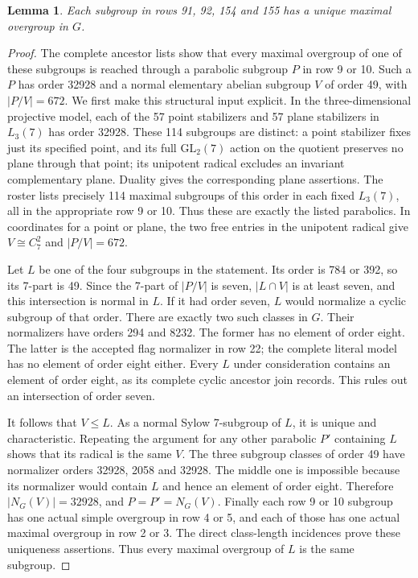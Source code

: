 \documentclass[11pt,a4paper]{article}
\newtheorem{lemma}{Lemma}\newtheorem{theorem}{Theorem}
\begin{document}
\begin{lemma}\label{alignment}
Each subgroup in rows 91, 92, 154 and 155 has a unique maximal
overgroup in $G$.
\end{lemma}
\begin{proof}
The complete ancestor lists show that every maximal overgroup of
one of these subgroups is reached through a parabolic subgroup $P$
in row 9 or 10. Such a $P$ has order 32928 and a normal elementary
abelian subgroup $V$ of order 49, with $|P/V|=672$.
We first make this structural input explicit. In the three-dimensional
projective model, each of the 57 point stabilizers and 57 plane
stabilizers in $L_3(7)$ has order 32928. These 114 subgroups are distinct:
a point stabilizer fixes just its specified point, and its full
$\mathrm{GL}_2(7)$ action on the quotient preserves no plane through
that point; its unipotent radical excludes an invariant complementary
plane. Duality gives the corresponding plane assertions. The roster
lists precisely 114 maximal subgroups of this order in each fixed
$L_3(7)$, all in the appropriate row 9 or 10. Thus these are exactly
the listed parabolics. In coordinates for a point or plane, the two
free entries in the unipotent radical give $V\cong C_7^2$ and
$|P/V|=672$.

Let $L$ be one of the four subgroups in the statement. Its order is
784 or 392, so its 7-part is 49. Since the 7-part of $|P/V|$ is
seven, $|L\cap V|$ is at least seven, and this intersection is normal
in $L$. If it had order seven, $L$ would normalize a cyclic subgroup
of that order. There are exactly two such classes in $G$. Their
normalizers have orders 294 and 8232. The former has no element of
order eight. The latter is the accepted flag normalizer in row 22;
the complete literal model has no element of order eight either.
Every $L$ under consideration contains an element of order eight,
as its complete cyclic ancestor join records. This rules out an
intersection of order seven.

It follows that $V\leq L$. As a normal Sylow 7-subgroup of $L$, it
is unique and characteristic. Repeating the argument for any other
parabolic $P'$ containing $L$ shows that its radical is the same
$V$. The three subgroup classes of order 49 have normalizer orders
32928, 2058 and 32928. The middle one is impossible because its
normalizer would contain $L$ and hence an element of order eight.
Therefore $|N_G(V)|=32928$, and $P=P'=N_G(V)$.
Finally each row 9 or 10 subgroup has one actual simple overgroup
in row 4 or 5, and each of those has one actual maximal overgroup
in row 2 or 3. The direct class-length incidences prove these
uniqueness assertions. Thus every maximal overgroup of $L$ is the
same subgroup.
\end{proof}
\end{document}
